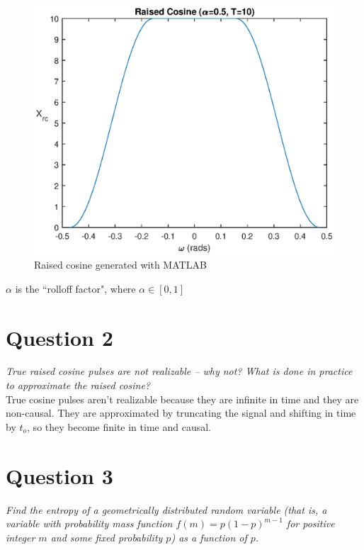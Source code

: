 \documentclass[12pt]{report}
\begin{document}
\begin{figure}[H]
    \begin{center}
        \includegraphics[scale=1]{raisedCos.eps}
        \caption{Raised cosine generated with MATLAB}
    \end{center}
\end{figure}

$\alpha$ is the ``rolloff factor", where $\alpha \in [0,1]$

\section*{Question 2}
\textit{True raised cosine pulses are not realizable – why not? What is done in practice to approximate
the raised cosine?} \\

True cosine pulses aren't realizable because they are infinite in time and they are non-causal.
They are approximated by truncating the signal and shifting in time by $t_o$, so they become finite in time and causal.

\section*{Question 3}
\textit{Find the entropy of a geometrically distributed random variable (that is, a variable with
probability mass function $f(m) = p(1-p)^{m-1}$ for positive integer $m$ and some fixed probability $p$) as a function of $p$.}
\end{document}
